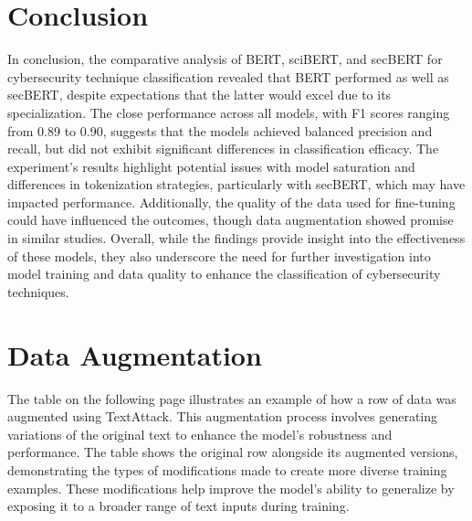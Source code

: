 \documentclass[11pt]{article}
\begin{document}
\section{Conclusion}

In conclusion, the comparative analysis of BERT, sciBERT, and secBERT for cybersecurity technique classification revealed that BERT performed as well as secBERT, despite expectations that the latter would excel due to its specialization. The close performance across all models, with F1 scores ranging from 0.89 to 0.90, suggests that the models achieved balanced precision and recall, but did not exhibit significant differences in classification efficacy. The experiment's results highlight potential issues with model saturation and differences in tokenization strategies, particularly with secBERT, which may have impacted performance. Additionally, the quality of the data used for fine-tuning could have influenced the outcomes, though data augmentation showed promise in similar studies. Overall, while the findings provide insight into the effectiveness of these models, they also underscore the need for further investigation into model training and data quality to enhance the classification of cybersecurity techniques.





\appendix
\section{Data Augmentation}
\label{sec:data}

The table on the following page illustrates an example of how a row of data was augmented using TextAttack. This augmentation process involves generating variations of the original text to enhance the model's robustness and performance. The table shows the original row alongside its augmented versions, demonstrating the types of modifications made to create more diverse training examples. These modifications help improve the model's ability to generalize by exposing it to a broader range of text inputs during training.
\end{document}
